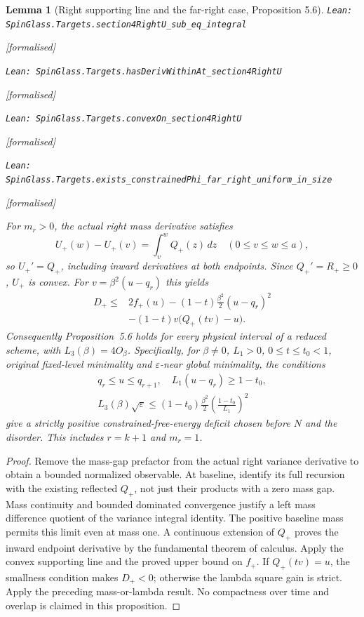 \documentclass[11pt]{article}
\providecommand{\lean}[1]{\leavevmode\par\nopagebreak
  {\noindent\normalfont\footnotesize\raggedright\texttt{Lean: #1}\par}\nopagebreak}
\providecommand{\leanok}{\par\nopagebreak
  {\noindent\normalfont\footnotesize\textcolor{green!50!black}{[formalised]}\par}\nopagebreak}
\newtheorem{lemma}[theorem]{Lemma}
\begin{document}
\begin{lemma}[Right supporting line and the far-right case, Proposition 5.6]
\lean{SpinGlass.Targets.section4RightU\_sub\_eq\_integral}\leanok
\lean{SpinGlass.Targets.hasDerivWithinAt\_section4RightU}\leanok
\lean{SpinGlass.Targets.convexOn\_section4RightU}\leanok
\lean{SpinGlass.Targets.exists\_constrainedPhi\_far\_right\_uniform\_in\_size}\leanok
For $m_r>0$, the actual right mass derivative satisfies
\[
 U_+(w)-U_+(v)=\int_v^w Q_+(z)\,dz
 \quad(0\le v\le w\le a),
\]
so $U_+'=Q_+$, including inward derivatives at both endpoints.
Since $Q_+'=R_+\ge0$, $U_+$ is convex. For
$v=\beta^2(u-q_r)$ this yields
\[
 \begin{split}
 D_+\le{}&2f_+(u)-(1-t)\frac{\beta^2}{2}(u-q_r)^2\\
 &-(1-t)v\bigl(Q_+(tv)-u\bigr).
 \end{split}
\]
Consequently Proposition~5.6 holds for every physical interval of a reduced
scheme, with $L_3(\beta)=4O_\beta$. Specifically, for $\beta\ne0$, $L_1>0$,
$0\le t\le t_0<1$, original fixed-level minimality and $\varepsilon$-near
global minimality, the conditions
\[
 \begin{gathered}
 q_r\le u\le q_{r+1},\quad L_1(u-q_r)\ge1-t_0,\\
 L_3(\beta)\sqrt\varepsilon\le
 (1-t_0)\frac{\beta^2}{2}\left(\frac{1-t_0}{L_1}\right)^2
 \end{gathered}
\]
give a strictly positive constrained-free-energy deficit chosen before $N$
and the disorder. This includes $r=k+1$ and $m_r=1$.
\end{lemma}
\begin{proof}
Remove the mass-gap prefactor from the actual right variance derivative to
obtain a bounded normalized observable. At baseline, identify its full
recursion with the existing reflected $Q_+$, not just their products with a
zero mass gap. Mass continuity and bounded dominated convergence justify a
left mass difference quotient of the variance integral identity. The positive
baseline mass permits this limit even at mass one. A continuous extension of
$Q_+$ proves the inward endpoint derivative by the fundamental theorem of
calculus. Apply the convex supporting line and the proved upper bound on
$f_+$. If $Q_+(tv)=u$, the smallness condition makes $D_+<0$; otherwise the
lambda square gain is strict. Apply the preceding mass-or-lambda result.
No compactness over time and overlap is claimed in this proposition.
\end{proof}
\end{document}
